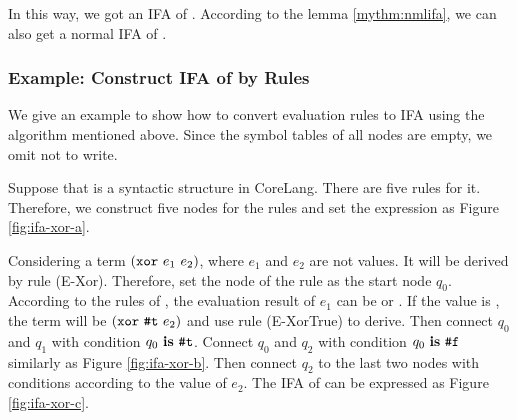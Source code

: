 In this way, we got an IFA of . According to the lemma \ref{mythm:nmlifa}, we can also get a normal IFA of .

\subsubsection{Example: Construct IFA of  by Rules}

We give an example to show how to convert evaluation rules to IFA using the algorithm mentioned above. Since the symbol tables of all nodes are empty, we omit not to write.


Suppose that  is a syntactic structure in CoreLang. There are five rules for it. Therefore, we construct five nodes for the rules and set the expression as Figure \ref{fig:ifa-xor-a}.

Considering a term $(\mbox{\tt xor}~e_1~e_2)$, where $e_1$ and $e_2$ are not values. It will be derived by rule (E-Xor). Therefore, set the node of the rule as the start node $q_0$. According to the rules of , the evaluation result of $e_1$ can be  or . If the value is , the term will be $(\mbox{\tt xor}~\mbox{\tt \#t}~e_2)$ and use rule (E-XorTrue) to derive. Then connect $q_0$ and $q_1$ with condition $q_0~\mbox{\rm \bf is}~\mbox{\tt \#t}$. Connect $q_0$ and $q_2$ with condition $q_0~\mbox{\rm \bf is}~\mbox{\tt \#f}$ similarly as Figure \ref{fig:ifa-xor-b}. Then connect $q_2$ to the last two nodes with conditions according to the value of $e_2$. The IFA of  can be expressed as Figure \ref{fig:ifa-xor-c}.

